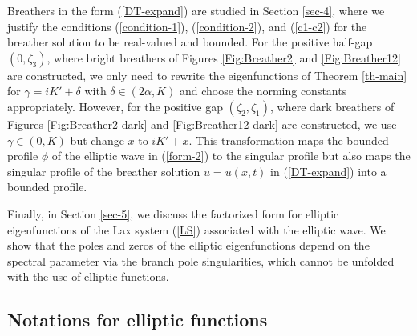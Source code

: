 \documentclass[12pt,reqno]{amsart}
\numberwithin{equation}{section}
\begin{document}
Breathers in the form (\ref{DT-expand}) are studied in Section \ref{sec-4}, 
where we justify the conditions (\ref{condition-1}), (\ref{condition-2}), and (\ref{c1-c2}) for the breather solution to be 
real-valued and bounded. For the positive half-gap $(0,\zeta_3)$, where bright breathers of Figures \ref{Fig:Breather2} and \ref{Fig:Breather12} are constructed, we only need to rewrite the eigenfunctions of Theorem \ref{th-main} 
for $\gamma = iK' + \delta$ with $\delta \in (2\alpha,K)$ and choose the norming constants appropriately. However, for the positive gap $(\zeta_2,\zeta_1)$, where dark breathers of Figures \ref{Fig:Breather2-dark} and \ref{Fig:Breather12-dark} are constructed, we use $\gamma \in (0,K)$ but change $x$ to $iK' + x$. This transformation maps the bounded profile $\phi$ of the elliptic wave in (\ref{form-2}) to the singular profile but also maps the singular profile of the breather solution $u = u(x,t)$ in (\ref{DT-expand}) into a bounded profile.

Finally, in Section \ref{sec-5}, we discuss the factorized form for elliptic eigenfunctions of the Lax system (\ref{LS}) associated with the elliptic wave. We show that the poles and zeros of the elliptic eigenfunctions depend on the spectral parameter via the branch pole singularities, which cannot be unfolded with the use of elliptic functions. 

\subsection{Notations for elliptic functions}
\end{document}
